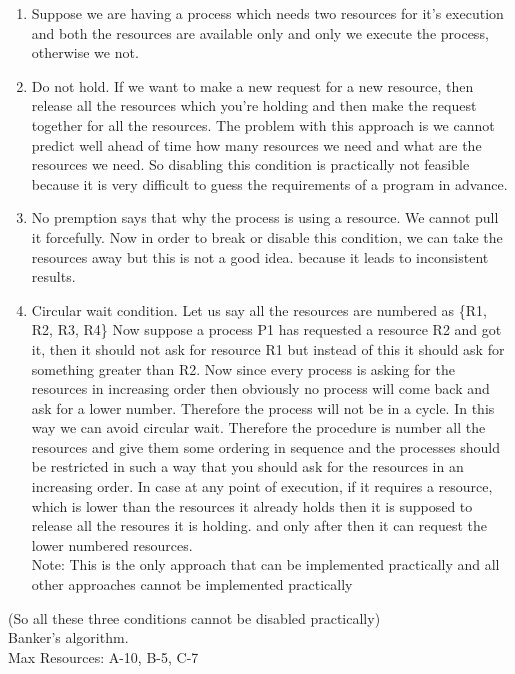 \documentclass[12pt,letterpaper]{article}
\begin{document}
  \begin{enumerate}
\item Suppose we are having a process which needs two resources 
  for it's execution and both the resources are available only and only 
  we execute the process, otherwise we not.
\item Do not hold. If we want to make a new request for a new resource, then release 
  all the resources which you're holding and then make the request together for all the 
  resources. 
  The problem with this approach is we cannot predict well ahead of time how many resources 
  we need and what are the resources we need. So disabling this condition is practically not 
  feasible because it is very difficult to guess the requirements of a program in advance. 
\item No premption says that why the process is using a resource. We cannot pull it 
  forcefully. Now in order to break or disable this condition, we can take the resources away 
  but this is not a good idea. because it leads to inconsistent results. 
\item Circular wait condition. Let us say all the resources are numbered as \{R1, R2, R3, R4\}  
  Now suppose a process P1 has requested a resource R2 and got it, then it should not ask for 
  resource R1 but instead of this it should ask for something greater than R2. Now since every process 
  is asking for the resources in increasing order then obviously no process will come back 
  and ask for a lower number. Therefore the process will not be in a cycle. In this way we can avoid 
  circular wait. Therefore the procedure is number all the resources and give them some ordering in 
  sequence and the processes should be restricted in such a way that you should ask for the 
  resources in an increasing order. In case at any point of execution, if it requires a resource, which 
  is lower than the resources it already holds then it is supposed to release all the resoures 
  it is holding. and only after then it can request the lower numbered resources. \\
  Note: This is the only approach that can be implemented practically and all other approaches cannot be implemented practically
  \end{enumerate}
  (So all these three conditions cannot be disabled practically)\\

  Banker's algorithm.\\
  Max Resources: A-10, B-5, C-7\\ 
  
\end{document}
